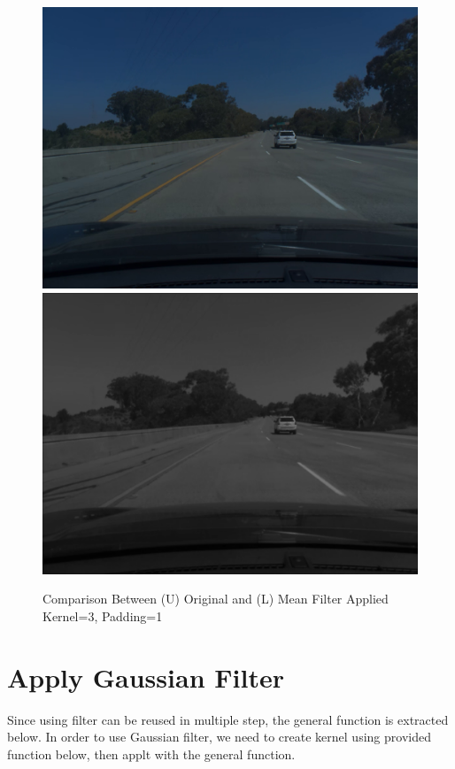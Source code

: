 \documentclass[12pt,a4paper]{report}
\begin{document}
\begin{figure}[!htb]
  \centering
  \includegraphics[height=0.4\paperheight]{test_img/img3.png}
  \includegraphics[height=0.4\paperheight]{result_img/img3_q1.png}
  \caption{Comparison Between (U) Original and (L) Mean Filter Applied Kernel=3, Padding=1}
\end{figure}
\clearpage

\section{Apply Gaussian Filter}
Since using filter can be reused in multiple step, the general function is extracted below.
In order to use Gaussian filter, we need to create kernel using provided function below, then applt with the general function.
\end{document}
